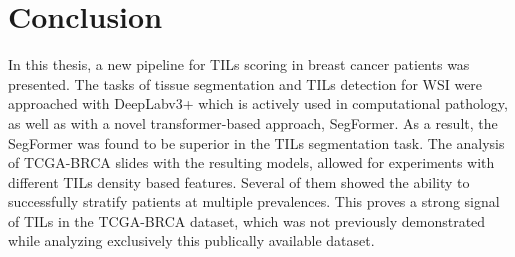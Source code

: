 \chapter{Conclusion}
In this thesis, a new pipeline for TILs scoring in breast cancer patients was presented.
The tasks of tissue segmentation and TILs detection for WSI were approached with DeepLabv3+
which is actively used in computational pathology, as well as with a novel transformer-based
approach, SegFormer. As a result, the SegFormer was found to be superior in the TILs
segmentation task. The analysis of TCGA-BRCA slides with the resulting models, allowed
for experiments with different TILs density based features. Several of them showed the
ability to successfully stratify patients at multiple prevalences. This proves a strong
signal of TILs in the TCGA-BRCA dataset, which was not previously demonstrated while
analyzing exclusively this publically available dataset. 

